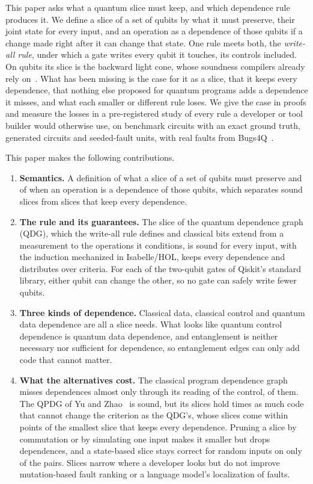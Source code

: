 This paper asks what a quantum slice must keep, and which dependence rule produces it. We define a slice of a set of
qubits by what it must preserve, their joint state for every input, and an operation as a dependence of those qubits
if a change made right after it can change that state. One rule meets both, the \emph{write-all rule}, under which a
gate writes every qubit it touches, its controls included. On qubits its slice is the backward light cone, whose
soundness compilers already rely on~\cite{murali2019triq, qiskit2025}. What has been missing is the case for it as a
slice, that it keeps every dependence, that nothing else proposed for quantum programs adds a dependence it misses,
and what each smaller or different rule loses. We give the case in proofs and measure the losses in a pre-registered
study of every rule a developer or tool builder would otherwise use, on \numNCircuits{} benchmark circuits with an
exact ground truth, \numFamCircuits{} generated circuits and \numRqThreeUnits{} seeded-fault units, with real faults
from Bugs4Q~\cite{zhao2023bugs4q}.

This paper makes the following contributions.
\begin{enumerate}
\item \textbf{Semantics.} A definition of what a slice of a set of qubits must preserve and of when an operation is a
dependence of those qubits, which separates sound slices from slices that keep every dependence.
\item \textbf{The rule and its guarantees.} The slice of the quantum dependence graph (QDG), which the write-all rule
defines and classical bits extend from a measurement to the operations it conditions, is sound for every input, with
the induction mechanized in Isabelle/HOL, keeps every dependence and distributes over criteria. For each of the
\numGateSignalN{} two-qubit gates of Qiskit's standard library, either qubit can change the other, so no gate can
safely write fewer qubits.
\item \textbf{Three kinds of dependence.} Classical data, classical control and quantum data dependence are all a slice
needs. What looks like quantum control dependence is quantum data dependence, and entanglement is neither necessary
nor sufficient for dependence, so entanglement edges can only add code that cannot matter.
\item \textbf{What the alternatives cost.} The classical program dependence graph misses dependences almost only
through its reading of the control, \numCpdgMissControlPct{} of them. The QPDG of Yu and Zhao~\cite{yu2025qpdg} is
sound, but its slices hold \numYzLcExcessRatio{} times as much code that cannot change the criterion as the QDG's,
whose slices come within \numLcExcess{} points of the smallest slice that keeps every dependence. Pruning a slice by
commutation or by simulating one input makes it smaller but drops dependences, and a state-based slice stays correct
for random inputs on only \numHThreeRate{} of the pairs. Slices narrow where a developer looks but do not improve
mutation-based fault ranking or a language model's localization of faults.
\end{enumerate}

